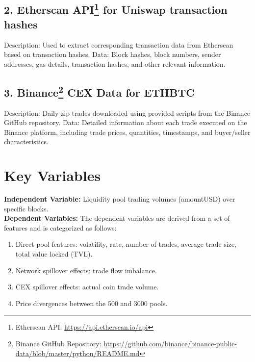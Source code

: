 \documentclass{article}
\begin{document}
{\subsection*{2. Etherscan API\footnote{Etherscan API: \url{https://api.etherscan.io/api}} for Uniswap transaction hashes}
\begin{minipage}[t]{0.78\textwidth}
Description: Used to extract corresponding transaction data from Etherscan based on transaction hashes.
Data: Block hashes, block numbers, sender addresses, gas details, transaction hashes, and other relevant information.
\end{minipage}

\subsection*{3. Binance\footnote{Binance GitHub Repository: \url{https://github.com/binance/binance-public-data/blob/master/python/README.md}} CEX Data for ETHBTC}
\begin{minipage}[t]{0.78\textwidth}
Description: Daily zip trades downloaded using provided scripts from the Binance GitHub repository.
Data: Detailed information about each trade executed on the Binance platform, including trade prices, quantities, timestamps, and buyer/seller characteristics.
\end{minipage}

\section*{Key Variables}
\textbf{Independent Variable:} Liquidity pool trading volumes (amountUSD) over specific blocks.\\

\textbf{Dependent Variables:}
The dependent variables are derived from a set of features and is categorized as follows:
\begin{enumerate}[label=\arabic*. ,itemsep=0pt, topsep=0pt]
\item Direct pool features: volatility, rate, number of trades, average trade size, total value locked (TVL).
\item Network spillover effects: trade flow imbalance.
\item CEX spillover effects: actual coin trade volume.
\item Price divergences between the 500 and 3000 pools.
\end{enumerate}

}
\end{document}
